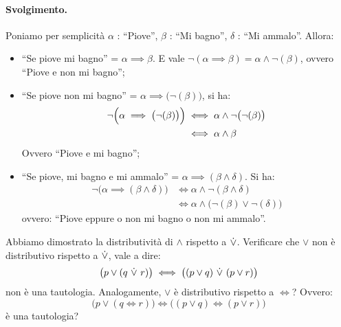 \paragraph*{Svolgimento.} Poniamo per semplicità $\alpha$ :  ``Piove'', $\beta$ : ``Mi bagno'', $\delta$ : ``Mi ammalo''. Allora:
\begin{itemize}
	\item ``Se piove mi bagno'' = $\alpha \implies \beta$. E vale $\neg(\alpha \implies \beta)= \alpha \land \neg(\beta)$, ovvero ``Piove e non mi bagno'';
	\item ``Se piove non mi bagno'' = $\alpha \implies \bigl(\neg (\beta)\bigr)$, si ha:
	\begin{align*}
		\neg \Bigl( \alpha \implies \bigl(\neg (\beta)\bigr) \Bigr) &\iff \alpha \land \neg \bigl( \neg (\beta) \bigr) \\
		&\iff \alpha \land \beta
	\end{align*}
	Ovvero ``Piove e mi bagno'';
	\item ``Se piove, mi bagno e mi ammalo'' = $\alpha \implies (\beta \land \delta)$. Si ha:
	\begin{align*}
		\neg \bigl( \alpha \implies (\beta \land \delta) \bigr) &\iff \alpha \land \neg (\beta \land \delta) \\
		&\iff \alpha \land \bigl(\neg(\beta) \lor \neg (\delta) \bigr)
	\end{align*}
	ovvero: ``Piove eppure o non mi bagno o non mi ammalo''. \hfill \blacksquare
\end{itemize}
\begin{exsbox}
	Abbiamo dimostrato la distributività di $\land$ rispetto a ${\displaystyle{\dot{\vee}}}$. Verificare che $\lor$ non è distributivo rispetto a ${\displaystyle{\dot{\vee}}}$, vale a dire:
	\begin{displaymath}
		\bigl(p \lor (q \ \xor \ r)\bigr) \iff \bigl((p \lor q)\  \xor \ (p \lor r)\bigr)
	\end{displaymath}
	non è una tautologia. Analogamente, $\lor$ è distributivo rispetto a $\iff$? Ovvero:
	\begin{displaymath}
		\bigl(p \lor (q \iff r)\bigr) \iff \bigl((p \lor q) \iff (p \lor r)\bigr)
	\end{displaymath}
	è una tautologia?
\end{exsbox}
